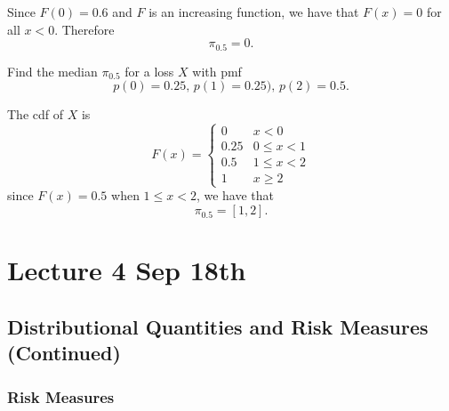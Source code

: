 \documentclass[notoc,notitlepage]{tufte-book}
\begin{document}
\begin{solution}
  Since $F(0) = 0.6$ and $F$ is an increasing function, we have that $F(x) = 0$ for all $x < 0$. Therefore
  \begin{equation*}
    \pi_{0.5} = 0.
  \end{equation*}
\end{solution}

\begin{eg}
  Find the median $\pi_{0.5}$ for a loss $X$ with pmf
  \begin{equation*}
    p(0) = 0.25, \, p(1) = 0.25), \, p(2) = 0.5.
  \end{equation*}
\end{eg}

\begin{solution}
  The cdf of $X$ is
  \begin{equation*}
    F(x) = \begin{cases}
      0    & x < 0 \\
      0.25 & 0 \leq x < 1 \\
      0.5  & 1 \leq x < 2 \\
      1    & x \geq 2
    \end{cases}
  \end{equation*}
  since $F(x) = 0.5$ when $1 \leq x < 2$, we have that
  \begin{equation*}
    \pi_{0.5} = [1, 2].
  \end{equation*}
\end{solution}




\chapter{Lecture 4 Sep 18th}%
\label{chp:lecture_4_sep_18th}

\section{Distributional Quantities and Risk Measures (Continued)}%
\label{sec:distributional_quantities_and_risk_measures_continued}

\subsection{Risk Measures}%
\label{sub:risk_measures}
\end{document}
